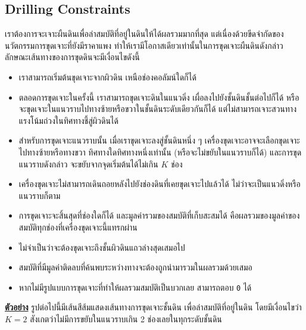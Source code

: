 \subsection*{\sectionfont\upshape Drilling Constraints}
เราต้องการจะเจาะผืนดินเพื่อล่าสมบัติที่อยู่ในดินให้ได้ผลรวมมากที่สุด แต่เนื่องด้วยขีดจำกัดของนวัตกรรมการขุดเจาะที่ยังมีราคาแพง ทำให้เรามีโอกาสเดียวเท่านั้นในการขุดเจาะผืนดินดังกล่าว ลักษณะเส้นทางของการขุดดินจะมีเงื่อนไขดังนี้
\begin{itemize}
\item เราสามารถเริ่มต้นขุดเจาะจากผิวดิน เหนือช่องคอลัมน์ใดก็ได้
\item ตลอดการขุดเจาะในครั้งนี้ เราสามารถขุดเจาะดินในแนวดิ่ง 
    เผื่อลงไปยังชั้นดินชั้นต่อไปก็ได้ หรือจะขุดเจาะในแนวราบไปทางซ้ายหรือขวาในชั้นดินระดับเดียวกันก็ได้ 
    แต่ไม่สามารถเจาะสวนทางแรงโน้มถ่วงในทิศทางชี้สู่ผิวดินได้
\item สำหรับการขุดเจาะแนวราบนั้น เมื่อเราขุดเจาะลงสู่ชั้นดินหนึ่ง ๆ 
    เครื่องขุดเจาะอาจจะเลือกขุดเจาะไปทางซ้ายหรือทางขวา ทิศทางใดทิศทางหนึ่งเท่านั้น 
    (หรือจะไม่ขยับในแนวราบก็ได้) และการขุดแนวราบดังกล่าว จะขยับจากจุดเริ่มต้นได้ไม่เกิน $K$ ช่อง
\item เครื่องขุดเจาะไม่สามารถเดินถอยหลังไปยังช่องดินที่เคยขุดเจาะไปแล้วได้ ไม่ว่าจะเป็นแนวดิ่งหรือแนวราบก็ตาม
\item การขุดเจาะจะสิ้นสุดที่ช่องใดก็ได้\;
    และมูลค่ารวมของสมบัติที่เก็บสะสมได้ คือผลรวมของมูลค่าของสมบัติทุกช่องที่เครื่องขุดเจาะนี้แทรกผ่าน

\item ไม่จำเป็นว่าจะต้องขุดเจาะถึงชั้นผิวดินแถวล่างสุดเสมอไป
\item สมบัติที่มีมูลค่าติดลบที่ค้นพบระหว่างทางจะต้องถูกนำมารวมในผลรวมด้วยเสมอ
\item หากไม่มีรูปแบบการขุดเจาะที่ทำให้ผลรวมสมบัติเป็นบวกเลย สามารถตอบ \verb|0| ได้
\end{itemize}

\bigskip\noindent
\textbf{\uline{ตัวอย่าง}} รูปต่อไปนี้มีเส้นสีส้มแสดงเส้นทางการขุดเจาะชั้นดิน เพื่อล่าสมบัติที่อยู่ในดิน\;
โดยมีเงื่อนไขว่า $K=2$ สังเกตว่าไม่มีการขยับในแนวราบเกิน 2 ช่องเลยในทุกระดับชั้นดิน

